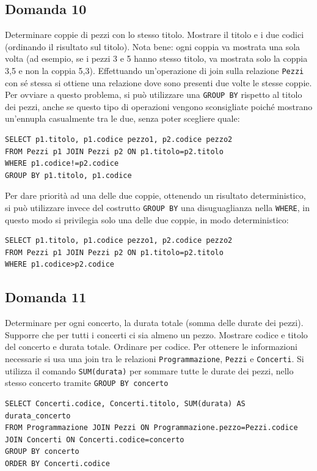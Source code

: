 \documentclass{article}
\numberwithin{equation}{subsection}
\begin{document}
\subsection{Domanda 10}
Determinare coppie di pezzi con lo stesso titolo. Mostrare il titolo e i due codici (ordinando il risultato sul titolo). Nota bene: ogni coppia va mostrata una sola volta 
(ad esempio, se i pezzi 3 e 5 hanno stesso titolo, va mostrata solo la coppia 3,5 e non la coppia 5,3). Effettuando un'operazione di join sulla relazione \verb|Pezzi| con sé stessa si ottiene una relazione dove sono 
presenti due volte le stesse coppie. Per ovviare a questo problema, si può utilizzare una \verb|GROUP BY| rispetto al titolo dei pezzi, anche se questo tipo di operazioni vengono sconsigliate poiché mostrano 
un'ennupla casualmente tra le due, senza poter scegliere quale:
\begin{verbatim}
SELECT p1.titolo, p1.codice pezzo1, p2.codice pezzo2
FROM Pezzi p1 JOIN Pezzi p2 ON p1.titolo=p2.titolo
WHERE p1.codice!=p2.codice
GROUP BY p1.titolo, p1.codice
\end{verbatim}

Per dare priorità ad una delle due coppie, ottenendo un risultato deterministico, si può utilizzare invece del costrutto \verb|GROUP BY| una 
disuguaglianza nella \verb|WHERE|, in questo modo si privilegia solo una delle due coppie, in modo deterministico:
\begin{verbatim}
SELECT p1.titolo, p1.codice pezzo1, p2.codice pezzo2
FROM Pezzi p1 JOIN Pezzi p2 ON p1.titolo=p2.titolo
WHERE p1.codice>p2.codice
\end{verbatim}

\subsection{Domanda 11}
Determinare per ogni concerto, la durata totale (somma delle durate dei pezzi). Supporre che per tutti i concerti ci sia almeno un pezzo. Mostrare codice e titolo del concerto e durata totale. Ordinare per codice. 
Per ottenere le informazioni necessarie si usa una join tra le relazioni \verb|Programmazione|, \verb|Pezzi| e \verb|Concerti|. Si utilizza il comando \verb|SUM(durata)| per sommare tutte le durate dei pezzi, nello 
stesso concerto tramite \verb|GROUP BY concerto|  
\begin{verbatim}
SELECT Concerti.codice, Concerti.titolo, SUM(durata) AS durata_concerto
FROM Programmazione JOIN Pezzi ON Programmazione.pezzo=Pezzi.codice
JOIN Concerti ON Concerti.codice=concerto
GROUP BY concerto
ORDER BY Concerti.codice
\end{verbatim}
\end{document}

